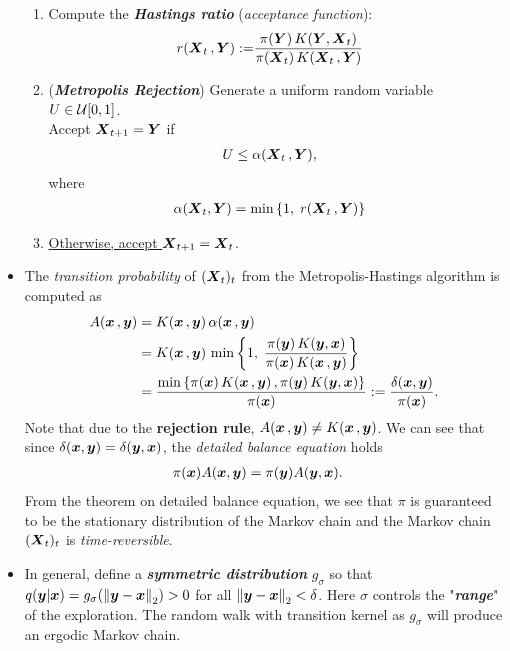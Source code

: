 \documentclass[11pt]{article}
\begin{document}
\begin{itemize}
\begin{enumerate}
\item Compute the \emph{\textbf{Hastings ratio}} (\emph{acceptance function}):
\begin{align}
r(\boldsymbol{X}_{t}\,, \boldsymbol{Y}):= &\frac{\pi(\boldsymbol{Y})\,K(\boldsymbol{Y}, \boldsymbol{X}_{t})}{\pi(\boldsymbol{X}_{t})\,K(\boldsymbol{X}_{t}\,, \boldsymbol{Y})} \label{eqn: mh_hastings_ratio}
\end{align}

\item (\emph{\textbf{Metropolis Rejection}}) Generate a uniform random variable $U\in {\mathcal U}[0,1]$.\\ 
Accept $\boldsymbol{X}_{t+1} = \boldsymbol{Y}$ if
\begin{align*}
U &\le \alpha(\boldsymbol{X}_{t}\,, \boldsymbol{Y}),
\end{align*} where 
\begin{align*}
\alpha(\boldsymbol{X}_{t}, \boldsymbol{Y}) &= \min\left\{1,\;r(\boldsymbol{X}_{t}\,, \boldsymbol{Y})\right\}
\end{align*}

\item \underline{Otherwise, accept $\boldsymbol{X}_{t+1} = \boldsymbol{X}_{t}$}.
\end{enumerate}

\item The \emph{transition probability} of $(\boldsymbol{X}_t)_t$ from the Metropolis-Hastings algorithm is computed as 
\begin{align}
A(\boldsymbol{x}\,, \boldsymbol{y}) &= K(\boldsymbol{x}\,, \boldsymbol{y})\,\alpha(\boldsymbol{x}\,, \boldsymbol{y}) \nonumber\\
&= K(\boldsymbol{x}\,, \boldsymbol{y})\,\min\left\{1, \; \frac{\pi(\boldsymbol{y})\,K(\boldsymbol{y}, \boldsymbol{x})}{\pi(\boldsymbol{x})\,K(\boldsymbol{x}\,, \boldsymbol{y})} \right\}\nonumber\\
&= \frac{\min\left\{\pi(\boldsymbol{x})\,K(\boldsymbol{x}\,, \boldsymbol{y})\,, \pi(\boldsymbol{y})\,K(\boldsymbol{y}, \boldsymbol{x})\right\}}{\pi(\boldsymbol{x})} := \frac{\delta(\boldsymbol{x}, \boldsymbol{y})}{\pi(\boldsymbol{x})}. \label{eqn: mh_transition_prob}
\end{align} Note that due to the \textbf{rejection rule}, $A(\boldsymbol{x}\,, \boldsymbol{y}) \neq K(\boldsymbol{x}\,, \boldsymbol{y})$. We can see that since $\delta(\boldsymbol{x}, \boldsymbol{y}) = \delta(\boldsymbol{y}, \boldsymbol{x})$, the \emph{detailed balance equation} holds
\begin{align}
\pi(\boldsymbol{x})A(\boldsymbol{x}, \boldsymbol{y}) &= \pi(\boldsymbol{y})A(\boldsymbol{y}, \boldsymbol{x}). \label{eqn: mh_detail_balance_equation}
\end{align} From the theorem on detailed balance equation, we see that $\pi$ is guaranteed to be the stationary distribution of the Markov chain and the Markov chain $(\boldsymbol{X}_t)_t$ is \emph{time-reversible}.

\item In general, define a \emph{\textbf{symmetric distribution}} $g_{\sigma}$ so that $q(\boldsymbol{y}|\boldsymbol{x}) = g_{\sigma}(\left\|\boldsymbol{y} - \boldsymbol{x}\right\|_{2}) > 0$ for all $\left\|\boldsymbol{y} - \boldsymbol{x}\right\|_{2} < \delta$. Here $\sigma$ controls the "\emph{\textbf{range}}" of the exploration. The random walk with transition kernel as $g_{\sigma}$ will produce an ergodic Markov chain. 


\end{itemize}
\end{document}
